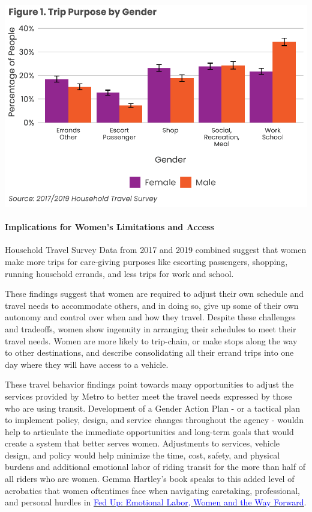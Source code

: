\documentclass[
  12pt,
]{article}
\begin{document}
\includegraphics{womens_history_story_draft_files/figure-latex/trip by gender-1.pdf}

\hypertarget{implications-for-womens-limitations-and-access}{%
\paragraph{Implications for Women's Limitations and
Access}\label{implications-for-womens-limitations-and-access}}

\begin{flushleft}
Household Travel Survey Data from 2017 and 2019 combined suggest that women make more trips for care-giving purposes like escorting passengers, shopping, running household errands, and less trips for work and school.


These findings suggest that women are required to adjust their own schedule and travel needs to accommodate others, and in doing so, give up some of their own autonomy and control over when and how they travel. Despite these challenges and tradeoffs, women show ingenuity in arranging their schedules to meet their travel needs. Women are more likely to trip-chain, or make stops along the way to other destinations, and describe consolidating all their errand trips into one day where they will have access to a vehicle.


These travel behavior findings point towards many opportunities to adjust the services provided by Metro to better meet the travel needs expressed by those who are using transit. Development of a Gender Action Plan - or a tactical plan to implement policy, design, and service changes throughout the agency - wouldn help to articulate the immediate opportunities and long-term goals that would create a system that better serves women. Adjustments to services, vehicle design, and policy would help minimize the time, cost, safety, and physical burdens and additional emotional labor of riding transit for the more than half of all riders who are women. Gemma Hartley's book speaks to this added level of acrobatics that women oftentimes face when navigating caretaking, professional, and personal hurdles in \href{https://www.gemmahartley.com/}{\underline{\textcolor{blue}{Fed Up: Emotional Labor, Women and the Way Forward}}}.
\end{flushleft}
\end{document}
